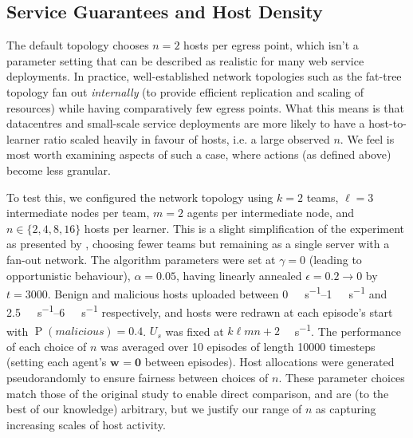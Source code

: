 \documentclass[conference, letterpaper, 10pt, times]{IEEEtran}
\newcommand{\wvec}[1]{\ensuremath{\bm{w}_{#1}}}
\begin{document}

\subsection{Service Guarantees and Host Density}
The default topology chooses $n=2$ hosts per egress point, which isn't a parameter setting that can be described as realistic for many web service deployments.
In practice, well-established network topologies such as the fat-tree topology fan out \emph{internally} (to provide efficient replication and scaling of resources) while having comparatively few egress points.
What this means is that datacentres and small-scale service deployments are more likely to have a host-to-learner ratio scaled heavily in favour of hosts, i.e. a large observed $n$.
We feel is most worth examining aspects of such a case, where actions (as defined above) become less granular.

To test this, we configured the network topology using $k=2$ teams, $\ell=3$ intermediate nodes per team, $m=2$ agents per intermediate node, and $n \in \{2, 4, 8, 16\}$ hosts per learner.
This is a slight simplification of the  experiment as presented by \textcite{DBLP:journals/eaai/MalialisK15}, choosing fewer teams but remaining as a single server with a fan-out network.
The algorithm parameters were set at $\gamma=0$ (leading to opportunistic behaviour), $\alpha=0.05$, having linearly annealed $\epsilon=0.2 \rightarrow 0$ by $t=3000$.
Benign and malicious hosts uploaded between \SIrange{0}{1}{\mega\bit\per\second} and \SIrange{2.5}{6}{\mega\bit\per\second} respectively, and hosts were redrawn at each episode's start with $\operatorname{P}(\mathit{malicious})=0.4$.
$U_s$ was fixed at $k \ell mn+2$ \si{\mega\bit\per\second}.
The performance of each choice of $n$ was averaged over \num{10} episodes of length \num{10000} timesteps (setting each agent's $\wvec{}=\bm{0}$ between episodes).
Host allocations were generated pseudorandomly to ensure fairness between choices of $n$.
These parameter choices match those of the original study to enable direct comparison, and are (to the best of our knowledge) arbitrary, but we justify our range of $n$ as capturing increasing scales of host activity.
\end{document}
